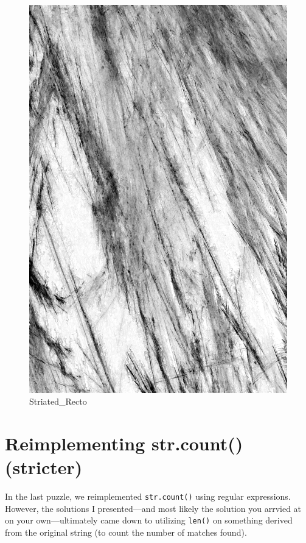 \begin{figure}
\centering
\includegraphics{images/Striated_Recto.png}
\caption{Striated\_Recto}
\end{figure}

\newpage

\hypertarget{reimplementing-str.count-stricter}{%
\section{Reimplementing str.count()
(stricter)}\label{reimplementing-str.count-stricter}}

In the last puzzle, we reimplemented \texttt{str.count()} using regular
expressions. However, the solutions I presented---and most likely the
solution you arrvied at on your own---ultimately came down to utilizing
\texttt{len()} on something derived from the original string (to count
the number of matches found).

